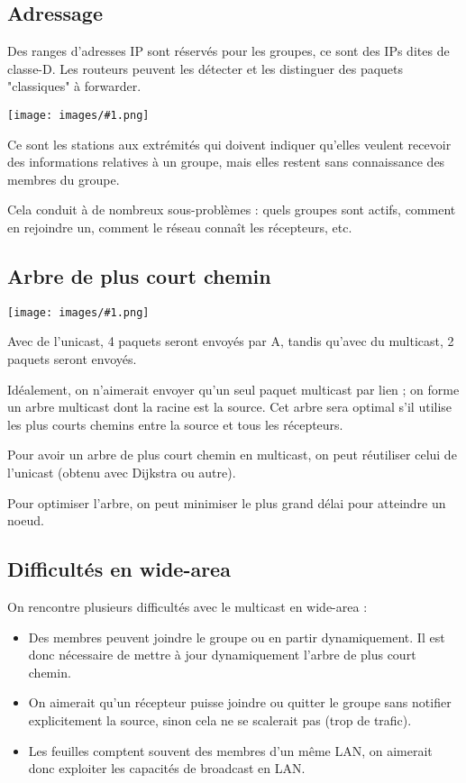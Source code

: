 \documentclass[10pt,a4paper]{report}
\newcommand{\dessin}[1]{\begin{center}\texttt{[image: images/\#1.png]}\end{center}}
\begin{document}
		\subsection{Adressage}
	
		Des ranges d'adresses IP sont réservés pour les groupes, ce sont des IPs dites de classe-D. Les routeurs peuvent les détecter et les distinguer des paquets "classiques" à forwarder.
	
		\dessin{127}
	
	
		Ce sont les stations aux extrémités qui doivent indiquer qu'elles veulent recevoir des informations relatives à un groupe, mais elles restent sans connaissance des membres du groupe.
	
		Cela conduit à de nombreux sous-problèmes : quels groupes sont actifs, comment en rejoindre un, comment le réseau connaît les récepteurs, etc.
		
		\subsection{Arbre de plus court chemin}
		
		\dessin{129}
		
		Avec de l'unicast, 4 paquets seront envoyés par A, tandis qu'avec du multicast, 2 paquets seront envoyés.
		
		Idéalement, on n'aimerait envoyer qu'un seul paquet multicast par lien ; on forme un arbre multicast dont la racine est la source. Cet arbre sera optimal s'il utilise les plus courts chemins entre la source et tous les récepteurs.
		
		Pour avoir un arbre de plus court chemin en multicast, on peut réutiliser celui de l'unicast (obtenu avec Dijkstra ou autre).
		
		Pour optimiser l'arbre, on peut minimiser le plus grand délai pour atteindre un noeud.
	
	
		\subsection{Difficultés en wide-area}
	
		On rencontre plusieurs difficultés avec le multicast en wide-area :
	
	\begin{itemize}
		\item Des membres peuvent joindre le groupe ou en partir dynamiquement. Il est donc nécessaire de mettre à jour dynamiquement l'arbre de plus court chemin.
		
		\item On aimerait qu'un récepteur puisse joindre ou quitter le groupe sans notifier explicitement la source, sinon cela ne se scalerait pas (trop de trafic).
		
		\item Les feuilles comptent souvent des membres d'un même LAN, on aimerait donc exploiter les capacités de broadcast en LAN.
	\end{itemize}
	
\end{document}
